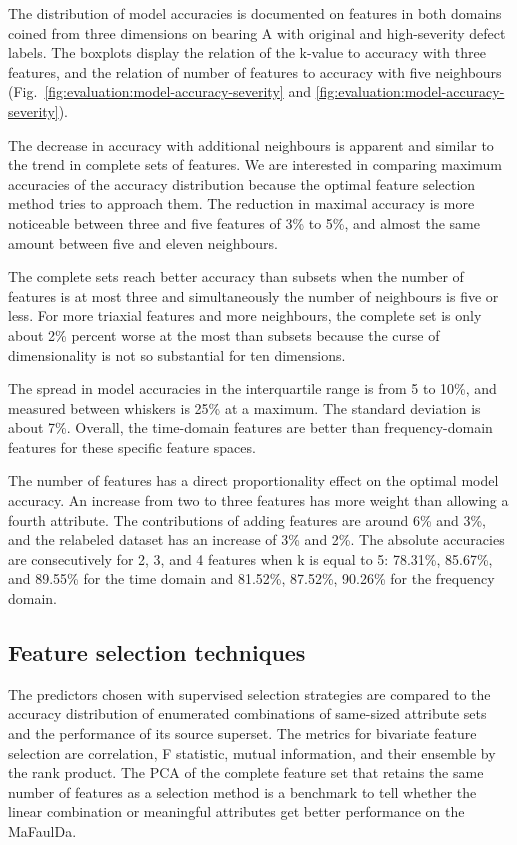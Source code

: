 The distribution of model accuracies is documented on features in both domains coined from three dimensions on bearing A with original and high-severity defect labels. The boxplots display the relation of the k-value to accuracy with three features, and the relation of number of features to accuracy with five neighbours (Fig.~\ref{fig:evaluation:model-accuracy-severity} and \ref{fig:evaluation:model-accuracy-severity}).

The decrease in accuracy with additional neighbours is apparent and similar to the trend in complete sets of features. We are interested in comparing maximum accuracies of the accuracy distribution because the optimal feature selection method tries to approach them. The reduction in maximal accuracy is more noticeable between three and five features of 3\% to 5\%, and almost the same amount between five and eleven neighbours. 

The complete sets reach better accuracy than subsets when the number of features is at most three and simultaneously the number of neighbours is five or less. For more triaxial features and more neighbours, the complete set is only about 2\% percent worse at the most than subsets because the curse of dimensionality is not so substantial for ten dimensions.

The spread in model accuracies in the interquartile range is from 5 to 10\%, and measured between whiskers is 25\% at a maximum. The standard deviation is about 7\%. Overall, the time-domain features are better than frequency-domain features for these specific feature spaces.

The number of features has a direct proportionality effect on the optimal model accuracy. An increase from two to three features has more weight than allowing a fourth attribute. The contributions of adding features are around 6\% and 3\%, and the relabeled dataset has an increase of 3\% and 2\%. The absolute accuracies are consecutively for 2, 3, and 4 features when k is equal to 5: 78.31\%, 85.67\%, and 89.55\% for the time domain and 81.52\%, 87.52\%, 90.26\% for the frequency domain.

\subsection{Feature selection techniques}
The predictors chosen with supervised selection strategies are compared to the accuracy distribution of  enumerated combinations of same-sized attribute sets and the performance of its source superset. The metrics for bivariate feature selection are correlation, F statistic, mutual information, and their ensemble by the rank product. The PCA of the complete feature set that retains the same number of features as a selection method is a benchmark to tell whether the linear combination or meaningful attributes get better performance on the MaFaulDa.

